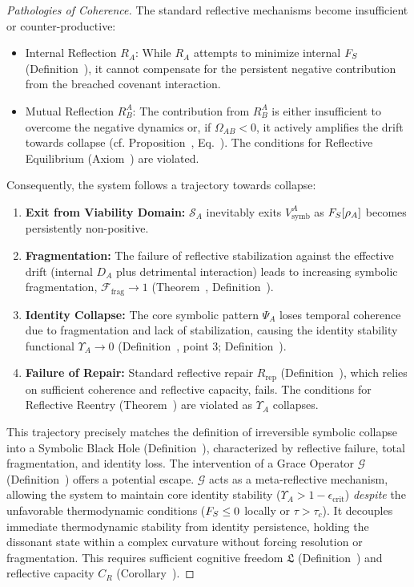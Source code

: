 \begin{proof}[Pathologies of Coherence]
The standard reflective mechanisms become insufficient or counter-productive:
\begin{itemize}
    \item Internal Reflection $R_A$: While $R_A$ attempts to minimize internal $F_S$ (Definition~), it cannot compensate for the persistent negative contribution from the breached covenant interaction.
    \item Mutual Reflection $R^A_B$: The contribution from $R^A_B$ is either insufficient to overcome the negative dynamics or, if $\Omega_{AB} < 0$, it actively amplifies the drift towards collapse (cf. Proposition~, Eq.~). The conditions for Reflective Equilibrium (Axiom~) are violated.
\end{itemize}
Consequently, the system follows a trajectory towards collapse:
\begin{enumerate}
    \item \textbf{Exit from Viability Domain:} $\mathcal{S}_A$ inevitably exits $V^A_{\text{symb}}$ as $F_S[\rho_A]$ becomes persistently non-positive.
    \item \textbf{Fragmentation:} The failure of reflective stabilization against the effective drift (internal $D_A$ plus detrimental interaction) leads to increasing symbolic fragmentation, $\mathcal{F}_{\text{frag}} \to 1$ (Theorem~, Definition~).
    \item \textbf{Identity Collapse:} The core symbolic pattern $\Psi_A$ loses temporal coherence due to fragmentation and lack of stabilization, causing the identity stability functional $\Upsilon_A \to 0$ (Definition~, point 3; Definition~).
    \item \textbf{Failure of Repair:} Standard reflective repair $R_{\text{rep}}$ (Definition~), which relies on sufficient coherence and reflective capacity, fails. The conditions for Reflective Reentry (Theorem~) are violated as $\Upsilon_A$ collapses.
\end{enumerate}
This trajectory precisely matches the definition of irreversible symbolic collapse into a Symbolic Black Hole (Definition~), characterized by reflective failure, total fragmentation, and identity loss.
The intervention of a Grace Operator $\mathcal{G}$ (Definition~) offers a potential escape. $\mathcal{G}$ acts as a meta-reflective mechanism, allowing the system to maintain core identity stability ($\Upsilon_A > 1 - \epsilon_{\text{crit}}$) \emph{despite} the unfavorable thermodynamic conditions ($F_S \le 0$ locally or $\tau > \tau_c$). It decouples immediate thermodynamic stability from identity persistence, holding the dissonant state within a complex curvature without forcing resolution or fragmentation. This requires sufficient cognitive freedom $\mathfrak{L}$ (Definition~) and reflective capacity $C_R$ (Corollary~).

\end{proof}

